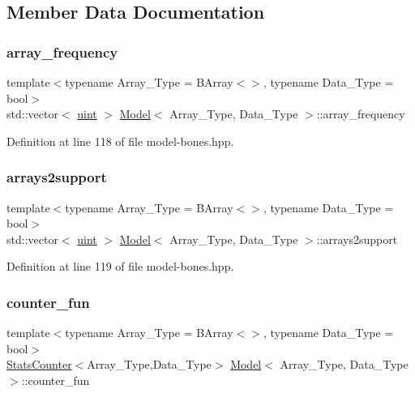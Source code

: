 \subsection{Member Data Documentation}
\mbox{\label{class_model_a55b4255d2514b1b22a0fb7361187fead}} 
\subsubsection{\texorpdfstring{array\+\_\+frequency}{array\_frequency}}
{\footnotesize\ttfamily template$<$typename Array\+\_\+\+Type  = B\+Array$<$$>$, typename Data\+\_\+\+Type  = bool$>$ \\
std\+::vector$<$ \hyperlink{typedefs_8hpp_a91ad9478d81a7aaf2593e8d9c3d06a14}{uint} $>$ \hyperlink{class_model}{Model}$<$ Array\+\_\+\+Type, Data\+\_\+\+Type $>$\+::array\+\_\+frequency}



Definition at line 118 of file model-\/bones.\+hpp.

\mbox{\label{class_model_a880b9e2535fcdaea9cc60d4dbdc7bcbc}} 
\subsubsection{\texorpdfstring{arrays2support}{arrays2support}}
{\footnotesize\ttfamily template$<$typename Array\+\_\+\+Type  = B\+Array$<$$>$, typename Data\+\_\+\+Type  = bool$>$ \\
std\+::vector$<$ \hyperlink{typedefs_8hpp_a91ad9478d81a7aaf2593e8d9c3d06a14}{uint} $>$ \hyperlink{class_model}{Model}$<$ Array\+\_\+\+Type, Data\+\_\+\+Type $>$\+::arrays2support}



Definition at line 119 of file model-\/bones.\+hpp.

\mbox{\label{class_model_a126cffe699d64e664ba6aa0b1796c780}} 
\subsubsection{\texorpdfstring{counter\+\_\+fun}{counter\_fun}}
{\footnotesize\ttfamily template$<$typename Array\+\_\+\+Type  = B\+Array$<$$>$, typename Data\+\_\+\+Type  = bool$>$ \\
\hyperlink{class_stats_counter}{Stats\+Counter}$<$Array\+\_\+\+Type,Data\+\_\+\+Type$>$ \hyperlink{class_model}{Model}$<$ Array\+\_\+\+Type, Data\+\_\+\+Type $>$\+::counter\+\_\+fun}



